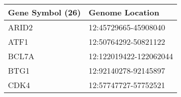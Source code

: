 \begin{tabular}{ll}
\toprule
Gene Symbol (26) &        Genome Location \\
\midrule
           ARID2 &   12:45729665-45908040 \\
            ATF1 &   12:50764292-50821122 \\
           BCL7A & 12:122019422-122062044 \\
            BTG1 &   12:92140278-92145897 \\
            CDK4 &   12:57747727-57752521 \\
\bottomrule
\end{tabular}
